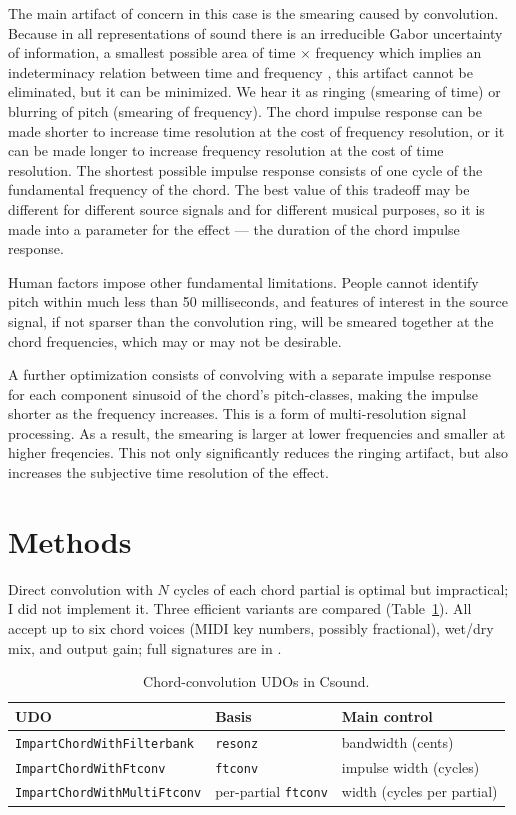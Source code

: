 \documentclass[runningheads,a4paper]{llncs}
\begin{document}
The main artifact of concern in this case is the smearing caused by 
convolution. Because in all representations of sound there is an irreducible 
Gabor uncertainty of information, a smallest possible area of time $\times$ 
frequency which implies an indeterminacy relation between time and frequency 
\cite{gabor1946theory}, this artifact cannot be eliminated, but it can be 
minimized. We hear it as ringing (smearing of time) or blurring of pitch 
(smearing of frequency). The chord impulse response can be made shorter to 
increase time resolution at the cost of frequency resolution, or it can be made 
longer to increase frequency resolution at the cost of time resolution. The 
shortest possible impulse response consists of one cycle of the fundamental 
frequency of the chord. The best value of this tradeoff may be different for 
different source signals and for different musical purposes, so it is made into 
a parameter for the effect --- the duration of the chord impulse response.

Human factors impose other fundamental limitations. People cannot identify 
pitch within much less than 50 milliseconds, and features of interest in the 
source signal, if not sparser than the convolution ring, will be smeared 
together at the chord frequencies, which may or may not be desirable.

A further optimization consists of convolving with a separate impulse response 
for each component sinusoid of the chord's pitch-classes, making the impulse 
shorter as the frequency increases. This is a form of multi-resolution signal 
processing. As a result, the smearing is larger at lower frequencies and 
smaller at higher freqencies. This not only significantly reduces the ringing 
artifact, but also increases the subjective time resolution of the effect.

\section{Methods}

Direct convolution with $N$ cycles of each chord partial is optimal but
impractical; I did not implement it. Three efficient variants are compared
(Table~\ref{tab:udos}). All accept up to six chord voices (MIDI key numbers,
possibly fractional), wet/dry mix, and output gain; full signatures are in
\submissionmaterialsrepocite.

\begin{table}[t]
\centering
\caption{Chord-convolution UDOs in Csound.}
\label{tab:udos}
\begin{tabular}{@{}lll@{}}
\toprule
UDO & Basis & Main control \\
\midrule
\texttt{ImpartChordWithFilterbank} & \texttt{resonz} \cite{csoundmanualresonz}
  & bandwidth (cents) \\
\texttt{ImpartChordWithFtconv} & \texttt{ftconv} \cite{csoundmanualftconv}
  & impulse width (cycles) \\
\texttt{ImpartChordWithMultiFtconv} & per-partial \texttt{ftconv}
  & width (cycles per partial) \\
\bottomrule
\end{tabular}
\end{table}
\end{document}
